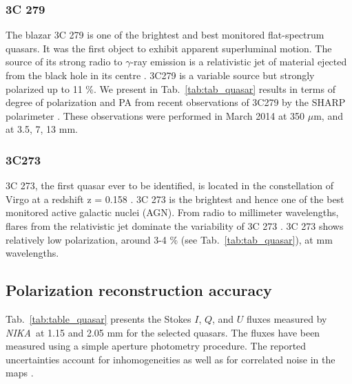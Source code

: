 \documentclass[twocolumn, traditabstract]{aa}
\newcommand{\nika}{{\it NIKA}}
\begin{document}
 \subsubsection*{3C 279}
 The blazar 3C 279 is one of the brightest and best monitored
 flat-spectrum quasars. It was the first object to exhibit apparent superluminal
 motion. The source of its strong radio to $\gamma$-ray emission is a
 relativistic jet of material ejected from the black hole in its centre
 \citep{apex3c279}.  3C279 is a variable source but strongly polarized up to 11
 \%.  We present in Tab.~\ref{tab:tab_quasar} results in terms of degree of
 polarization and PA from recent observations of 3C279 by the SHARP polarimeter
 \citep{sharp3c279}. These observations were performed in March 2014 at 350
 $\mu$m, and at 3.5, 7, 13 mm.
 \subsubsection*{3C273}
 3C 273, the first quasar ever to be identified, is located in the constellation
 of Virgo at a redshift z = 0.158 \citep{3c273madsen}. 3C 273 is the brightest
 and hence one of the best monitored active galactic nuclei (AGN). From radio to
 millimeter wavelengths, flares from the relativistic jet dominate the variability
 of 3C 273 \citep{Abdo2010}. 3C 273 shows relatively low polarization, around 3-4
 \% (see Tab.~\ref{tab:tab_quasar}), at mm wavelengths.
  \subsection{Polarization reconstruction accuracy}
  Tab.~\ref{tab:table_quasar} presents the Stokes $I$, $Q$, and $U$
 fluxes measured by \nika\ at 1.15 and 2.05 mm for the selected quasars. The
 fluxes have been measured using a simple aperture photometry procedure. The
 reported uncertainties account for inhomogeneities as well as for correlated
 noise in the maps \citep[see][for details]{adam2016}. 
  
\end{document}

